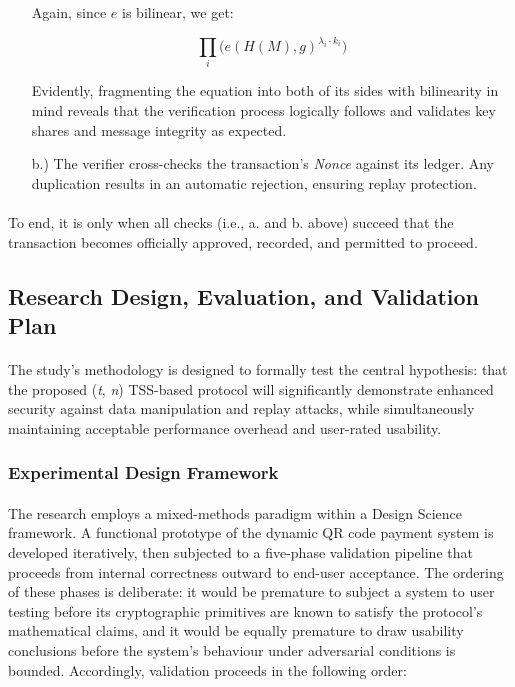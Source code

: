 \documentclass[a4paper]{scl-article}
\begin{document}
\begin{enumerate}
    Again, since $e$ is bilinear, we get:
    
    \[
    \prod_i \Big(e(H(M), g)^{\lambda_i \cdot k_i}\Big)
    \]
    
    Evidently, fragmenting the equation into both of its sides with bilinearity in mind reveals that the verification process logically follows and validates key shares and message integrity as expected.

    \item[b.)]The verifier cross-checks the transaction’s \textit{Nonce} against its ledger. Any duplication results in an automatic rejection, ensuring replay protection.
\end{enumerate}

\paragraph{}To end, it is only when all checks (i.e., a. and b. above) succeed that the transaction becomes officially approved, recorded, and permitted to proceed. 


\subsection{Research Design, Evaluation, and Validation Plan}
\label{sect:meth4}

\paragraph{}The study's methodology is designed to formally test the central hypothesis: that the proposed (\textit{t}, \textit{n}) TSS-based protocol will significantly demonstrate enhanced security against data manipulation and replay attacks, while simultaneously maintaining acceptable performance overhead and user-rated usability.

\subsubsection{Experimental Design Framework}
\label{sect:meth4_a}
\paragraph{}The research employs a mixed-methods paradigm within a Design Science framework. A functional prototype of the dynamic QR code payment system is developed iteratively, then subjected to a five-phase validation pipeline that proceeds from internal correctness outward to end-user acceptance. The ordering of these phases is deliberate: it would be premature to subject a system to user testing before its cryptographic primitives are known to satisfy the protocol's mathematical claims, and it would be equally premature to draw usability conclusions before the system's behaviour under adversarial conditions is bounded. Accordingly, validation proceeds in the following order:
\end{document}
